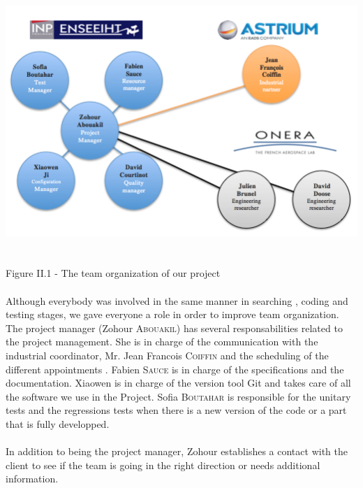 \documentclass{report}
\begin{document}
\begin{center}
\includegraphics[scale=0.8]{data/teamOrganization.png}
~\\~\\Figure II.1 - The team organization of our project
\end{center}

\paragraph{}
\hspace{4mm}\textnormal{Although everybody was involved in the same manner in searching
, coding and testing stages, we gave everyone a role in
order to improve team organization. 
The project manager (Zohour \textsc{Abouakil}) has several responsabilities 
related to the project management. She is in charge of the
communication with the industrial coordinator, Mr. Jean Francois
\textsc{Coiffin} and the scheduling of the different appointments
. Fabien \textsc{Sauce} is in charge of the specifications and the documentation. 
Xiaowen is in charge of the version tool Git and takes care of all 
the software we use in the Project. Sofia \textsc{Boutahar} 
is responsible for the unitary tests and the regressions tests when 
there is a new version of the code or a part that is fully developped.}

\paragraph{}
\hspace{4mm}\textnormal{In addition to being the project manager,  Zohour establishes a 
contact with the client to see if the team is going in the right
direction or needs additional information.}
\end{document}
